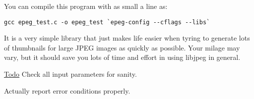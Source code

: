 You can compile this program with as small a line as:



\footnotesize\begin{verbatim}
gcc epeg_test.c -o epeg_test `epeg-config --cflags --libs`
\end{verbatim}\normalsize


It is a very simple library that just makes life easier when tyring to generate lots of thumbnails for large JPEG images as quickly as possible. Your milage may vary, but it should save you lots of time and effort in using libjpeg in general.

\begin{Desc}
\item[\hyperlink{todo__todo000001}{Todo}]Check all input parameters for sanity. 

Actually report error conditions properly. \end{Desc}
